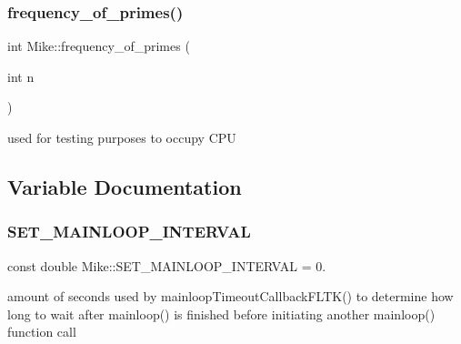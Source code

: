 \subsubsection{\texorpdfstring{frequency\+\_\+of\+\_\+primes()}{frequency\_of\_primes()}}
{\footnotesize\ttfamily int Mike\+::frequency\+\_\+of\+\_\+primes (\begin{DoxyParamCaption}\item[{int}]{n }\end{DoxyParamCaption})}

used for testing purposes to occupy C\+PU 

\subsection{Variable Documentation}
\mbox{\label{namespace_mike_abbeda217f93388b7dd036c32d183f426}} 
\subsubsection{\texorpdfstring{S\+E\+T\+\_\+\+M\+A\+I\+N\+L\+O\+O\+P\+\_\+\+I\+N\+T\+E\+R\+V\+AL}{SET\_MAINLOOP\_INTERVAL}}
{\footnotesize\ttfamily const double Mike\+::\+S\+E\+T\+\_\+\+M\+A\+I\+N\+L\+O\+O\+P\+\_\+\+I\+N\+T\+E\+R\+V\+AL = 0.\hspace{0.3cm}{\ttfamily [static]}}

amount of seconds used by mainloop\+Timeout\+Callback\+F\+L\+T\+K() to determine how long to wait after mainloop() is finished before initiating another mainloop() function call 